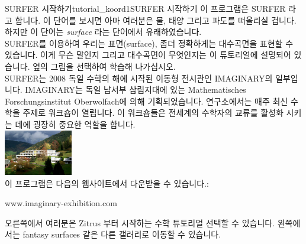\begin{surferIntroPage}{SURFER 시작하기}{tutorial_koord1}{SURFER 시작하기}
이 프로그램은 SURFER 라고 합니다. 이 단어를 보시면 아마 여러분은 물, 태양 그리고 파도를 떠올리실 겁니다. 하지만 이 단어는 {\it surface} 라는 단어에서 유래하였습니다.
\\
SURFER를 이용하여 우리는 표면(surface), 좀더 정확하게는 대수곡면을 표현할 수 있습니다. 이게 무슨 말인지 그리고 대수곡면이 무엇인지는 이 튜토리얼에 설명되어 있습니다. 옆의 그림을 선택하여 학습해 나가십시오.\\
SURFER는 2008 독일 수학의 해에 시작된 이동형 전시관인 IMAGINARY의 일부입니다. IMAGINARY는 독일 남서부 삼림지대에 있는 Mathematisches Forschungsinstitut Oberwolfach에 의해 기획되었습니다. 연구소에서는 매주 최신 수학을 주제로 워크숍이 열립니다. 이 워크숍들은 전세계의 수학자의 교류를 활성화 시키는 데에 굉장히 중요한 역할을 합니다.\\
\vspace{0.2cm} \hspace{3.5cm}\includegraphics[width=3cm]{./../../common/images/photo_mfo.jpg}\\
이 프로그램은 다음의 웹사이트에서 다운받을 수 있습니다.: \\
\begin{centering}
www.imaginary-exhibition.com\\
\end{centering}
 \vspace{0.2cm}
오른쪽에서 여러분은 Zitrus 부터 시작하는 수학 튜토리얼 선택할 수 있습니다. 왼쪽에서는 fantasy surfaces 같은 다른 갤러리로 이동할 수 있습니다.
\end{surferIntroPage}
